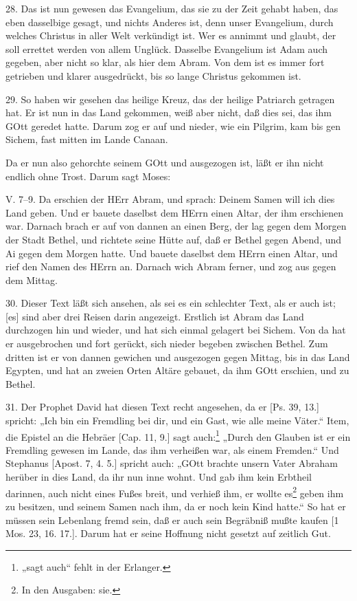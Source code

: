 28. Das ist nun gewesen das Evangelium, das sie zu der Zeit gehabt haben, das eben dasselbige gesagt, und nichts Anderes ist, denn unser Evangelium, durch welches Christus in aller Welt verkündigt ist. Wer es annimmt und glaubt, der soll errettet werden von allem Unglück. Dasselbe Evangelium ist Adam auch gegeben, aber nicht so klar, als hier dem Abram. Von dem ist es immer fort getrieben und klarer ausgedrückt, bis so lange Christus gekommen ist.

29. So haben wir gesehen das heilige Kreuz, das der heilige Patriarch getragen hat. Er ist nun in das Land gekommen, weiß aber nicht, daß dies sei, das ihm GOtt geredet hatte. Darum zog er auf und nieder, wie ein Pilgrim, kam bis gen Sichem, fast mitten im Lande Canaan.

Da er nun also gehorchte seinem GOtt und ausgezogen ist, läßt er ihn nicht endlich ohne Trost. Darum sagt Moses:

\begin{schriftzitat}
V. 7–9. Da erschien der HErr Abram, und sprach: Deinem Samen will ich dies Land geben. Und er bauete daselbst dem HErrn einen Altar, der ihm erschienen war. Darnach brach er auf von dannen an einen Berg, der lag gegen dem Morgen der Stadt Bethel, und richtete seine Hütte auf, daß er Bethel gegen Abend, und Ai gegen dem Morgen hatte. Und bauete daselbst dem HErrn einen Altar, und rief den Namen des HErrn an. Darnach wich Abram ferner, und zog aus gegen dem Mittag.
\end{schriftzitat}

30. Dieser Text läßt sich ansehen, als sei es ein schlechter Text, als er auch ist; [es] sind aber drei Reisen darin angezeigt. Erstlich ist Abram das Land durchzogen hin und wieder, und hat sich einmal gelagert bei Sichem. Von da hat er ausgebrochen und fort gerückt, sich nieder begeben zwischen Bethel. Zum dritten ist er von dannen gewichen und ausgezogen gegen Mittag, bis in das Land Egypten, und hat an zweien Orten Altäre gebauet, da ihm GOtt erschien, und zu Bethel.

31. Der Prophet David hat diesen Text recht angesehen, da er [Ps. 39, 13.] spricht: „Ich bin ein Fremdling bei dir, und ein Gast, wie alle meine Väter.“ Item, die Epistel an die Hebräer [Cap. 11, 9.] sagt auch:\footnote{„sagt auch“ fehlt in der Erlanger.} „Durch den Glauben ist er ein Fremdling gewesen im Lande, das ihm verheißen war, als einem Fremden.“ Und Stephanus [Apost. 7, 4. 5.] spricht auch: „GOtt brachte unsern Vater Abraham herüber in dies Land, da ihr nun inne wohnt. Und gab ihm kein Erbtheil darinnen, auch nicht eines Fußes breit, und verhieß ihm, er wollte es\footnote{In den Ausgaben: sie.} geben ihm zu besitzen, und seinem Samen nach ihm, da er noch kein Kind hatte.“ So hat er müssen sein Lebenlang fremd sein, daß er auch sein Begräbniß mußte kaufen [1 Mos. 23, 16. 17.]. Darum hat er seine Hoffnung nicht gesetzt auf zeitlich Gut.

